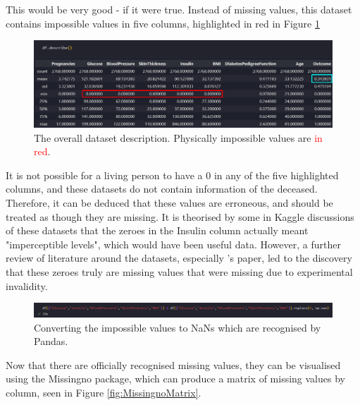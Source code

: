 \documentclass[12pt]{report}
\newcommand{\para}{\vspace{8pt}\noindent}
\begin{document}
\para This would be very good - if it were true. Instead of missing values, this dataset contains impossible values in five columns, highlighted in red in 
Figure \ref{fig:ImpossibleValues}

\begin{figure}[H]
    \centering
    \includegraphics[width=\linewidth]{EDA/ImpossibleValues.png}
    \caption{The overall dataset description. Physically impossible values are \textcolor{red}{in red}.}
    \label{fig:ImpossibleValues}
\end{figure}

\para It is not possible for a living person to have a 0 in any of the five highlighted columns, and these datasets do not contain information of the deceased.
Therefore, it can be deduced that these values are erroneous, and should be treated as though they are missing. It is theorised by some in Kaggle discussions of these 
datasets that the zeroes in the Insulin column actually meant "imperceptible levels", which would have been useful data. However, a further review of literature around the datasets,
especially \textcite{hayashi_rule_2016}'s paper, led to the discovery that these zeroes truly are missing values that were missing due to experimental invalidity.

\begin{figure}[H]
    \centering
    \includegraphics[width=\linewidth]{EDA/ConvertImpossibleValues-NoSums.png} %
    \caption{Converting the impossible values to NaNs which are recognised by Pandas.}
    \label{fig:ConvertImpossibleValues}
\end{figure}

\para Now that there are officially recognised missing values, they can be visualised using the Missingno package, which can produce a 
matrix of missing values by column, seen in Figure \ref{fig:MissingnoMatrix}.
\end{document}

